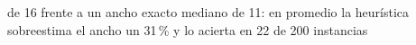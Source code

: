 de 16 frente a un ancho exacto mediano de 11: en promedio la heurística sobreestima el ancho un 31\,\% y lo acierta en 22 de 200 instancias